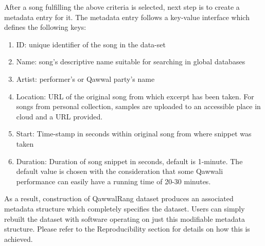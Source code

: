 \documentclass{article}
\begin{document}
After a song fulfilling the above criteria is selected, next step is to create a metadata entry for it. The metadata entry follows a key-value interface which defines the following keys:
\begin{enumerate}
\item ID: unique identifier of the song in the data-set
\item Name: song's descriptive name suitable for searching in global databases
\item Artist: performer's or Qawwal party's name
\item Location: URL of the original song from which excerpt has been taken. For songs from personal collection, samples are uploaded to an accessible place in cloud and a URL provided.
\item Start: Time-stamp in seconds within original song from where snippet was taken
\item Duration: Duration of song snippet in seconds, default is 1-minute. The default value is chosen with the consideration that some Qawwali performance can easily have a running time of 20-30 minutes.
\end{enumerate}

As a result, construction of QawwalRang dataset produces an associated metadata structure which completely specifies the dataset. Users can simply rebuilt the dataset with software operating on just this modifiable metadata structure. Please refer to the Reproducibility section for details on how this is achieved.
\end{document}
